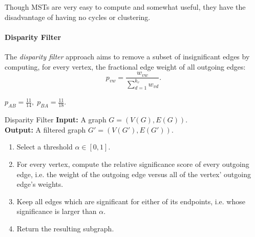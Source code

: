 \documentclass[english]{panikzettel}
\begin{document}
Though MSTs are very easy to compute and somewhat useful, they have the disadvantage of having no cycles or clustering.

\begin{halfboxl}
    \paragraph{Disparity Filter}
    The \textit{disparity filter} approach aims to remove a subset of insignificant edges by computing, for every vertex, the fractional edge weight of all outgoing edges:
    \[
        p_{vw} = \frac{w_{vw}}{\sum_{d=1}^{k_v}w_{vd}}.
    \]
\end{halfboxl}%
\begin{halfboxr}
    \vspace{-\baselineskip}
    \begin{center}

        $p_{AB} = \frac{11}{14}, \; p_{BA} = \frac{11}{18}$.
    \end{center}
\end{halfboxr}

\begin{algo}{Disparity Filter}
    \textbf{Input:} A graph $G = (V(G),E(G))$. \\
    \textbf{Output:} A filtered graph $G' = (V(G'),E(G'))$.
    \tcblower
    \begin{enumerate}
            \item Select a threshold $\alpha \in [0,1]$.
            \item For every vertex, compute the relative significance score of every outgoing edge, i.e. the weight of the outgoing edge versus all of the vertex' outgoing edge's weights.
            \item Keep all edges which are significant for either of its endpoints, i.e. whose significance is larger than $\alpha$.
            \item Return the resulting subgraph.
    \end{enumerate}
\end{algo}
\end{document}
